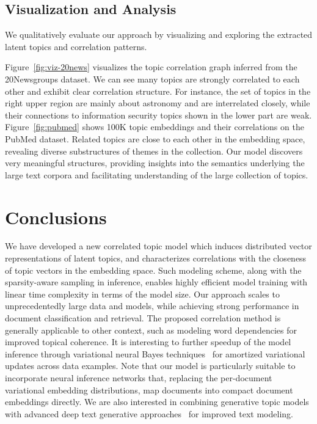 \documentclass[sigconf]{acmart}
\begin{document}
\subsection{Visualization and Analysis}
We qualitatively evaluate our approach by visualizing and exploring the extracted latent topics and correlation patterns. 

Figure~\ref{fig:viz-20news} visualizes the topic correlation graph inferred from the 20Newsgroups dataset. We can see many topics are strongly correlated to each other and exhibit clear correlation structure. For instance, the set of topics in the right upper region are mainly about astronomy and are interrelated closely, while their connections to information security topics shown in the lower part are weak.
%
Figure~\ref{fig:pubmed} shows 100K topic embeddings and their correlations on the PubMed dataset. Related topics are close to each other in the embedding space, revealing diverse substructures of themes in the collection.
Our model discovers very meaningful structures, providing insights into the semantics underlying the large text corpora and facilitating understanding of the large collection of topics. 

\section{Conclusions}\label{sec:conclude}
We have developed a new correlated topic model which induces distributed vector representations of latent topics, and characterizes correlations with the closeness of topic vectors in the embedding space. Such modeling scheme, along with the sparsity-aware sampling in inference, enables highly efficient model training with linear time complexity in terms of the model size. Our approach scales to unprecedentedly large data and models, while achieving strong performance in document classification and retrieval. The proposed correlation method is generally applicable to other context, such as modeling word dependencies for improved topical coherence. It is interesting to further speedup of the model inference through variational neural Bayes techniques~\cite{kingma2013auto,goyal2017nonparametric} for amortized variational updates across data examples. Note that our model is particularly suitable to incorporate neural inference networks that, replacing the per-document variational embedding distributions, map documents into compact document embeddings directly. We are also interested in combining generative topic models with advanced deep text generative approaches~\cite{hu2017unifying,hu2017controllable,liang2017recurrent} for improved text modeling.
\end{document}
